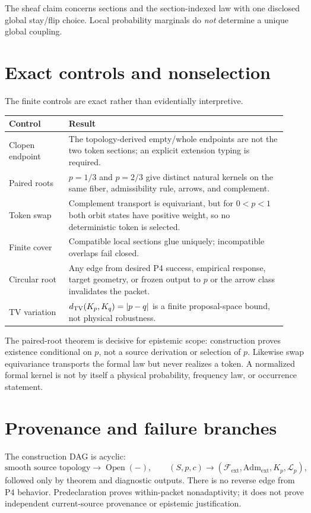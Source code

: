 \documentclass[11pt]{article}
\newcommand{\Fext}{\mathcal F_{\mathrm{ext}}}
\newcommand{\Adm}{\mathrm{Adm}_{\mathrm{ext}}}
\newcommand{\Gen}{\mathcal L_{p}}
\begin{document}
The sheaf claim concerns sections and the section-indexed law with one
disclosed global stay/flip choice.  Local probability marginals do \emph{not}
determine a unique global coupling.

\section{Exact controls and nonselection}

The finite controls are exact rather than evidentially interpretive.
\begin{longtable}{p{0.20\linewidth}p{0.73\linewidth}}
\toprule
Control & Result \\
\midrule
Clopen endpoint & The topology-derived empty/whole endpoints are not the two
token sections; an explicit extension typing is required. \\
Paired roots & $p=1/3$ and $p=2/3$ give distinct natural kernels on the same
fiber, admissibility rule, arrows, and complement. \\
Token swap & Complement transport is equivariant, but for $0<p<1$ both orbit
states have positive weight, so no deterministic token is selected. \\
Finite cover & Compatible local sections glue uniquely; incompatible overlaps
fail closed. \\
Circular root & Any edge from desired P4 success, empirical response, target
geometry, or frozen output to $p$ or the arrow class invalidates the packet. \\
TV variation & $d_{\rm TV}(K_p,K_q)=|p-q|$ is a finite proposal-space bound,
not physical robustness. \\
\bottomrule
\end{longtable}

The paired-root theorem is decisive for epistemic scope: construction proves
existence conditional on $p$, not a source derivation or selection of $p$.
Likewise swap equivariance transports the formal law but never realizes a
token.  A normalized formal kernel is not by itself a physical probability,
frequency law, or occurrence statement.

\section{Provenance and failure branches}

The construction DAG is acyclic:
\[
 \text{smooth source topology}\longrightarrow\operatorname{Open}(-),
 \qquad
 (S,p,c)\longrightarrow(\Fext,\Adm,K_p,\Gen),
\]
followed only by theorem and diagnostic outputs.  There is no reverse edge
from P4 behavior.  Predeclaration proves within-packet nonadaptivity; it does
not prove independent current-source provenance or epistemic justification.
\end{document}
